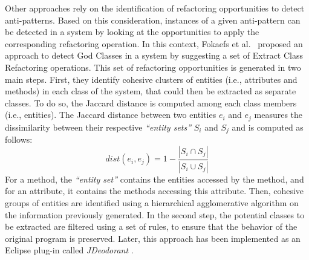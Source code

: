 Other approaches rely on the identification of refactoring opportunities to detect anti-patterns. Based on this consideration, instances of a given anti-pattern can be detected in a system by looking at the opportunities to apply the corresponding refactoring operation. In this context, Fokaefs et al.~\cite{fokaefs2012identification} proposed an approach to detect God Classes in a system by suggesting a set of Extract Class Refactoring operations. This set of refactoring opportunities is generated in two main steps. First, they identify cohesive clusters of entities (i.e., attributes and methods) in each class of the system, that could then be extracted as separate classes. To do so, the Jaccard distance is computed among each class members (i.e., entities). The Jaccard distance between two entities $e_{i}$ and $e_{j}$ measures the dissimilarity between their respective \textit{``entity sets''} $S_{i}$ and $S_{j}$ and is computed as follows:
\begin{equation}
\label{jaccard entity to entity}
dist(e_{i}, e_{j}) = 1 - \frac{|S_{i} \cap S_{j}|}{|S_{i} \cup S_{j}|}
\end{equation}
For a method, the \textit{``entity set''} contains the entities accessed by the method, and for an attribute, it contains the methods accessing this attribute. Then, cohesive groups of entities are identified using a hierarchical agglomerative algorithm on the information previously generated. In the second step, the potential classes to be extracted are filtered using a set of rules, to ensure that the behavior of the original program is preserved.
Later, this approach has been implemented as an Eclipse plug-in called \textit{JDeodorant} \cite{fokaefs2011jdeodorant}.


